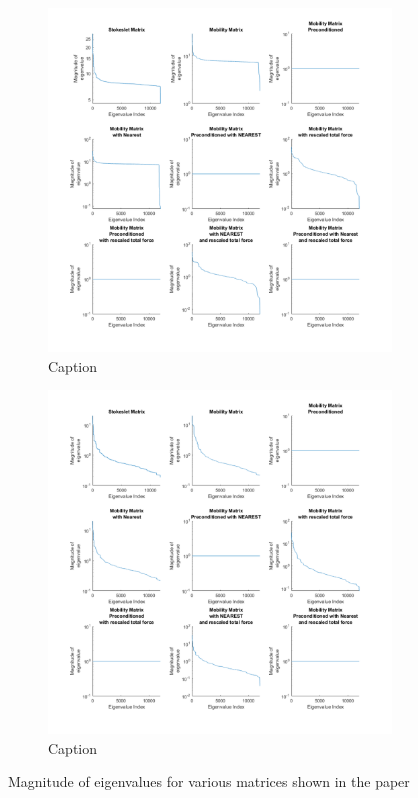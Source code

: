 \begin{figure}
\ContinuedFloat
    \centering
    \begin{subfigure}[b]{0.49\textwidth}
        \includegraphics[height=0.49\textheight,keepaspectratio]{Images/Eigenplots/EigenPlots-2.pdf}
        \caption{Caption}
    \end{subfigure}
    \hfill
    \begin{subfigure}[b]{0.49\textwidth}
        \includegraphics[height=0.49\textheight,keepaspectratio]{Images/Eigenplots/EigenPlots-5.pdf}
        \caption{Caption}
        \label{fig:Eigen5}
    \end{subfigure}
    \caption{Magnitude of eigenvalues for various matrices shown in the paper}
\end{figure}
